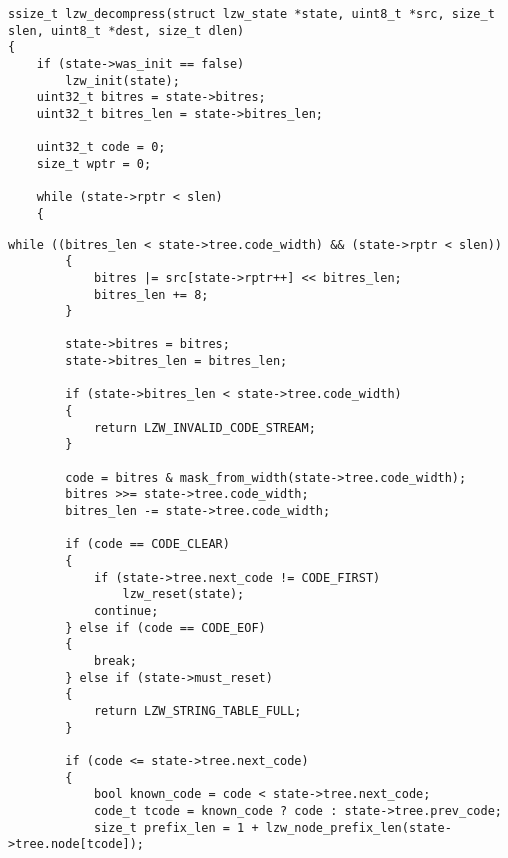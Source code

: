 \begin{center}
    \captionsetup{justification=raggedright,singlelinecheck=off}
    \begin{lstlisting}[label=lst:decompress-1,caption=Реализация алгоритма разжатия  LZW (часть 1)]
ssize_t lzw_decompress(struct lzw_state *state, uint8_t *src, size_t slen, uint8_t *dest, size_t dlen)
{
	if (state->was_init == false)
		lzw_init(state);
	uint32_t bitres = state->bitres;
	uint32_t bitres_len = state->bitres_len;

	uint32_t code = 0;
	size_t wptr = 0;

	while (state->rptr < slen)
    {
\end{lstlisting}
\end{center}


\begin{center}
    \captionsetup{justification=raggedright,singlelinecheck=off}
    \begin{lstlisting}[label=lst:decompress-2,caption=Реализация алгоритма разжатия  LZW (часть 2)]
		while ((bitres_len < state->tree.code_width) && (state->rptr < slen))
        {
			bitres |= src[state->rptr++] << bitres_len;
			bitres_len += 8;
		}

		state->bitres = bitres;
		state->bitres_len = bitres_len;

		if (state->bitres_len < state->tree.code_width)
        {
			return LZW_INVALID_CODE_STREAM;
		}

		code = bitres & mask_from_width(state->tree.code_width);
		bitres >>= state->tree.code_width;
		bitres_len -= state->tree.code_width;

		if (code == CODE_CLEAR)
        {
			if (state->tree.next_code != CODE_FIRST)
				lzw_reset(state);
			continue;
		} else if (code == CODE_EOF)
        {
			break;
		} else if (state->must_reset)
        {
			return LZW_STRING_TABLE_FULL;
		}

		if (code <= state->tree.next_code)
        {
			bool known_code = code < state->tree.next_code;
			code_t tcode = known_code ? code : state->tree.prev_code;
			size_t prefix_len = 1 + lzw_node_prefix_len(state->tree.node[tcode]);
\end{lstlisting}
\end{center}

